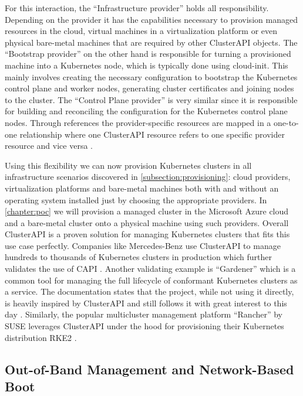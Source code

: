     For this interaction, the ``Infrastructure provider'' holds all responsibility. Depending on the provider it has the capabilities necessary to provision managed resources in the cloud, virtual machines in a virtualization platform or even physical bare-metal machines that are required by other ClusterAPI objects. The ``Bootstrap provider'' on the other hand is responsible for turning a provisioned machine into a Kubernetes node, which is typically done using cloud-init. This mainly involves creating the necessary configuration to bootstrap the Kubernetes control plane and worker nodes, generating cluster certificates and joining nodes to the cluster. The ``Control Plane provider'' is very similar since it is responsible for building and reconciling the configuration for the Kubernetes control plane nodes. Through references the provider-specific resources are mapped in a one-to-one relationship where one ClusterAPI resource refers to one specific provider resource and vice versa \cite{the_cluster_api_book, spectrocloud_2022}.\newpage

    \noindent Using this flexibility we can now provision Kubernetes clusters in all infrastructure scenarios discovered in \autoref{subsection:provisioning}: cloud providers, virtualization platforms and bare-metal machines both with and without an operating system installed just by choosing the appropriate providers. In \autoref{chapter:poc} we will provision a managed cluster in the Microsoft Azure cloud and a bare-metal cluster onto a physical machine using such providers. Overall ClusterAPI is a proven solution for managing Kubernetes clusters that fits this use case perfectly. Companies like Mercedes-Benz use ClusterAPI to manage hundreds to thousands of Kubernetes clusters in production which further validates the use of CAPI \cite{mercedes_kubecon_700}. Another validating example is ``Gardener'' which is a common tool for managing the full lifecycle of conformant Kubernetes clusters as a service. The documentation states that the project, while not using it directly, is heavily inspired by ClusterAPI and still follows it with great interest to this day \cite{gardener_capi}. Similarly, the popular multicluster management platform ``Rancher'' by SUSE leverages ClusterAPI under the hood for provisioning their Kubernetes distribution RKE2 \cite{rancher_uses_clusterapi}.
    
    \subsection{Out-of-Band Management and Network-Based Boot}
    \label{subsection:network-boot}

